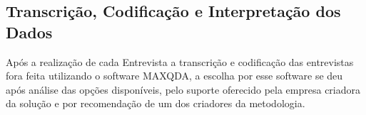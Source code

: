\subsection{Transcrição, Codificação e Interpretação dos Dados}
\label{subsection:codificacao_e_interpretacao_dos_dados}

Após a realização de cada Entrevista a transcrição e codificação das entrevistas fora feita utilizando o software MAXQDA, a escolha por esse software se deu após análise das opções disponíveis, pelo suporte oferecido pela empresa criadora da solução e por recomendação de um dos criadores da metodologia.